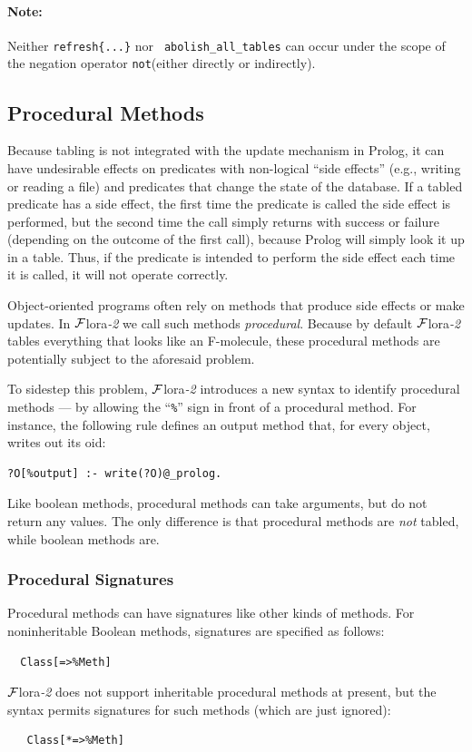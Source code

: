\documentclass[11pt]{article}
\newcommand{\FLORA}{{\mbox{\sc ${\cal F}${lora}\rm\emph{-2}}}\xspace}
\newcommand{\TNOT}{{{\tt not}}\xspace}
\begin{document}
\paragraph{Note:} Neither {\tt refresh\{...\}} nor {\tt
  abolish\_all\_tables} can occur under the scope of the
negation operator  \TNOT (either directly or indirectly).


\subsection{Procedural Methods}\label{sec-proc-methods}

%
Because tabling is not integrated with the update mechanism in Prolog, it can
have undesirable effects on predicates with non-logical ``side effects''
(e.g., writing or reading a file) and predicates that change the state of
the database.  If a tabled predicate has a side effect, the first time the
predicate is called the side effect is performed, but the second time the
call simply returns with success or failure (depending on the outcome of
the first call), because Prolog will simply look it up in a table.  Thus, if
the predicate is intended to perform the side effect each time it is
called, it will not operate correctly.

Object-oriented programs often rely on methods that produce side effects
or make updates.  In \FLORA we call such methods \emph{procedural}.
Because by default \FLORA tables everything that looks like an F-molecule,
these procedural methods are potentially subject to the aforesaid problem.

To sidestep this problem, \FLORA introduces a new syntax to identify
procedural methods --- by allowing the ``\verb|%|'' sign in front of a
procedural method. For instance, the following rule defines an output
method that, for every object, writes out its oid:
\begin{verbatim}
?O[%output] :- write(?O)@_prolog.
\end{verbatim}
Like boolean methods, procedural methods can take arguments, but do not
return any values.  The only difference is that procedural methods are
\emph{not} tabled, while boolean methods are.

\subsubsection{Procedural Signatures}

Procedural methods can have signatures like other kinds of methods.
For noninheritable Boolean methods, signatures are specified as follows:
\begin{verbatim}
  Class[=>%Meth]
\end{verbatim}
\FLORA does not support inheritable procedural methods at present, but the
syntax permits signatures for such methods (which are just ignored):
\begin{verbatim}
   Class[*=>%Meth]
\end{verbatim}
\end{document}
